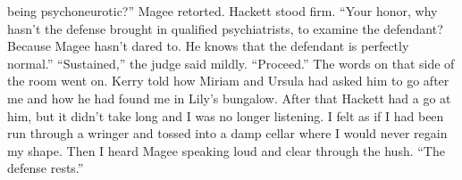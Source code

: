 \documentclass{novel}
\begin{document}
being psychoneurotic?” Magee retorted. Hackett stood firm. “Your honor, why hasn’t the defense brought in qualified psychiatrists, to examine the defendant? Because Magee hasn’t dared to. He knows that the defendant is perfectly normal.” “Sustained,” the judge said mildly. “Proceed.” The words on that side of the room went on. Kerry told how Miriam and Ursula had asked him to go after me and how he had found me in Lily’s bungalow. After that Hackett had a go at him, but it didn’t take long and I was no longer listening. I felt as if I had been run through a wringer and tossed into a damp cellar where I would never regain my shape. Then I heard Magee speaking loud and clear through the hush. “The defense rests.”


\begin{ChapterStart}

\vspace{3\nbs}
\end{ChapterStart}

\end{document}
